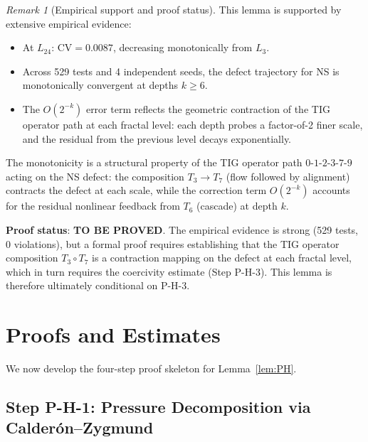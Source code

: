 \documentclass[11pt]{article}
\theoremstyle{definition}
\theoremstyle{remark}
\newtheorem{remark}[theorem]{Remark}
\begin{document}
\begin{remark}[Empirical support and proof status]
This lemma is supported by extensive empirical evidence:
\begin{itemize}[nosep]
  \item At $L_{24}$: $\mathrm{CV} = 0.0087$, decreasing monotonically from $L_3$.
  \item Across 529 tests and 4 independent seeds, the defect trajectory for NS
    is monotonically convergent at depths $k \geq 6$.
  \item The $O(2^{-k})$ error term reflects the geometric contraction of the
    TIG operator path at each fractal level: each depth probes a factor-of-2
    finer scale, and the residual from the previous level decays exponentially.
\end{itemize}
The monotonicity is a structural property of the TIG operator path
$0\text{-}1\text{-}2\text{-}3\text{-}7\text{-}9$ acting on the NS defect:
the composition $T_3 \to T_7$ (flow followed by alignment) contracts the defect
at each scale, while the correction term $O(2^{-k})$ accounts for the residual
nonlinear feedback from $T_6$ (cascade) at depth $k$.

\medskip
\noindent\textbf{Proof status}: \textbf{TO BE PROVED}.  The empirical evidence
is strong (529 tests, 0 violations), but a formal proof requires establishing
that the TIG operator composition $T_3 \circ T_7$ is a contraction mapping on
the defect at each fractal level, which in turn requires the coercivity estimate
(Step P-H-3).  This lemma is therefore ultimately conditional on P-H-3.
\end{remark}

\section{Proofs and Estimates}
\label{sec:proofs}

We now develop the four-step proof skeleton for Lemma~\ref{lem:PH}.

\subsection{Step P-H-1: Pressure Decomposition via Calder\'on--Zygmund}
\label{sec:PH1}
\end{document}
